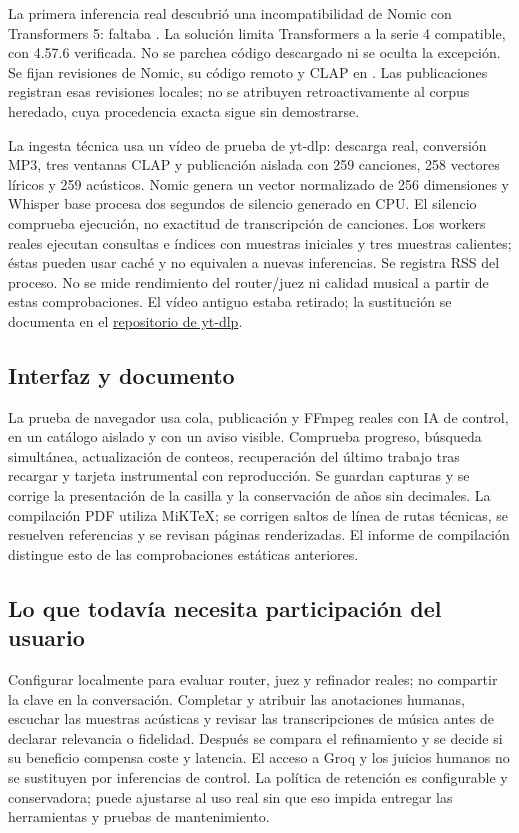 La primera inferencia real descubrió una incompatibilidad de Nomic con
Transformers 5: faltaba . La solución limita
Transformers a la serie 4 compatible, con 4.57.6 verificada. No se parchea código
descargado ni se oculta la excepción. Se fijan revisiones de Nomic, su código
remoto y CLAP en . Las publicaciones
registran esas revisiones locales; no se atribuyen retroactivamente al corpus
heredado, cuya procedencia exacta sigue sin demostrarse.

La ingesta técnica usa un vídeo de prueba de yt-dlp: descarga real, conversión
MP3, tres ventanas CLAP y publicación aislada con 259 canciones, 258 vectores
líricos y 259 acústicos. Nomic genera un vector normalizado de 256 dimensiones
y Whisper base procesa dos segundos de silencio generado en CPU. El silencio
comprueba ejecución, no exactitud de transcripción de canciones. Los workers
reales ejecutan consultas e índices con muestras iniciales y tres muestras
calientes; éstas pueden usar caché y no equivalen a nuevas inferencias.
Se registra RSS del proceso. No se mide rendimiento del router/juez ni calidad
musical a partir de estas comprobaciones.
El vídeo antiguo estaba retirado; la sustitución se documenta en el
\href{https://github.com/yt-dlp/yt-dlp/issues/12263}{repositorio de yt-dlp}.

\subsection{Interfaz y documento}
La prueba de navegador usa cola, publicación y FFmpeg reales con IA de control,
en un catálogo aislado y con un aviso visible. Comprueba progreso, búsqueda
simultánea, actualización de conteos, recuperación del último trabajo tras
recargar y tarjeta instrumental con reproducción. Se guardan capturas y se
corrige la presentación de la casilla y la conservación de años sin decimales.
La compilación PDF utiliza MiKTeX; se corrigen saltos de línea de rutas técnicas,
se resuelven referencias y se revisan páginas renderizadas. El informe de
compilación distingue esto de las comprobaciones estáticas anteriores.

\subsection{Lo que todavía necesita participación del usuario}
Configurar  localmente para evaluar router, juez y refinador
reales; no compartir la clave en la conversación. Completar y atribuir las
anotaciones humanas, escuchar las muestras acústicas y revisar las transcripciones
de música antes de declarar relevancia o fidelidad. Después se compara el
refinamiento y se decide si su beneficio compensa coste y latencia. El acceso
a Groq y los juicios humanos no se sustituyen por inferencias de control.
La política de retención es configurable y conservadora; puede ajustarse al uso
real sin que eso impida entregar las herramientas y pruebas de mantenimiento.

